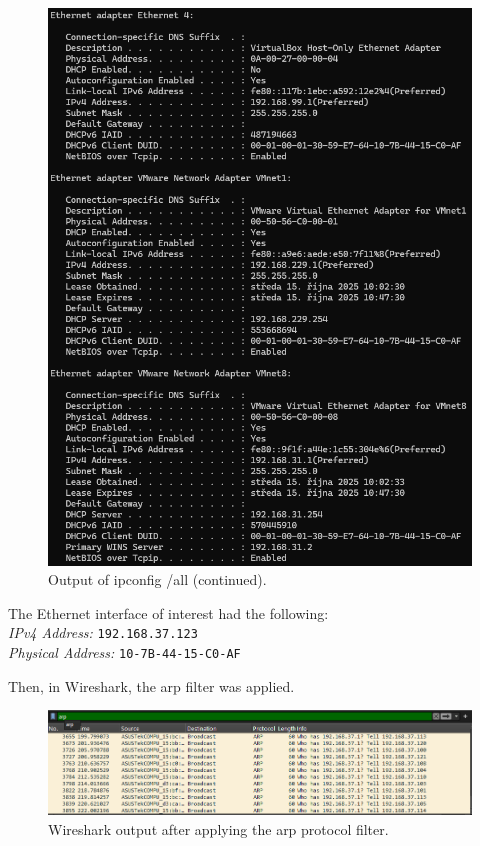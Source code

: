 \documentclass[a4paper,12pt]{article}
\begin{document}
\begin{figure}[H]
\centering
\includegraphics[width=\linewidth, height=0.55\textheight, keepaspectratio]{Pictures_Lab1/objective 2p2.png}
\caption{Output of ipconfig /all (continued).}
\end{figure}

The Ethernet interface of interest had the following:\\
\textit{IPv4 Address: }\texttt{192.168.37.123}\\
\textit{Physical Address: }\texttt{10-7B-44-15-C0-AF}

Then, in Wireshark, the arp filter was applied.
\begin{figure}[H]
\centering
\includegraphics[width=\linewidth,keepaspectratio]{Pictures_Lab1/arp protocol applied.png}
\caption{Wireshark output after applying the arp protocol filter.}
\end{figure}
\end{document}
